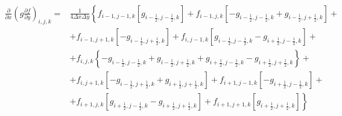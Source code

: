 \documentclass[12pt, a4paper]{article}
\newcommand\onehalf{\frac{1}{2}} %
\begin{document}
\begin{equation*}
    \begin{split}
        \left.
            \frac
                {\partial}
                {\partial x}
            \left(
                g
                \frac
                    {\partial f}
                    {\partial y}
            \right)
        \right._{i, j, k}
        = &
        \frac
            {1}
            {4 \Delta x \Delta y}
        \left\{
            f_{i - 1, j - 1, k}
            \left[
                g_{i - \onehalf, j - \onehalf, k}
            \right]
            +
            f_{i - 1, j, k}
            \left[
                - g_{i - \onehalf, j - \onehalf, k}
                + g_{i - \onehalf, j + \onehalf, k}
            \right]
            +
        \right.
        \\ &
        \left.
            +
            f_{i - 1, j + 1, k}
            \left[
                - g_{i - \onehalf, j + \onehalf, k}
            \right]
            +
            f_{i, j - 1, k}
            \left[
                g_{i - \onehalf, j - \onehalf, k}
                - g_{i + \onehalf, j - \onehalf, k}
            \right]
            +
        \right.
        \\ &
        \left.
            +
            f_{i, j, k}
            \left\{
                - g_{i - \onehalf, j - \onehalf, k}
                + g_{i - \onehalf, j + \onehalf, k}
                + g_{i + \onehalf, j - \onehalf, k}
                - g_{i + \onehalf, j + \onehalf, k}
            \right\}
            +
        \right.
        \\ &
        \left.
            +
            f_{i, j + 1, k}
            \left[
                - g_{i - \onehalf, j + \onehalf, k}
                + g_{i + \onehalf, j + \onehalf, k}
            \right]
            +
            f_{i + 1, j - 1, k}
            \left[
                - g_{i + \onehalf, j - \onehalf, k}
            \right]
            +
        \right.
        \\ &
        \left.
            +
            f_{i + 1, j, k}
            \left[
                g_{i + \onehalf, j - \onehalf, k}
                - g_{i + \onehalf, j + \onehalf, k}
            \right]
            +
            f_{i + 1, j + 1, k}
            \left[
                g_{i + \onehalf, j + \onehalf, k}
            \right]
        \right\}
    \end{split}
\end{equation*}
\end{document}
